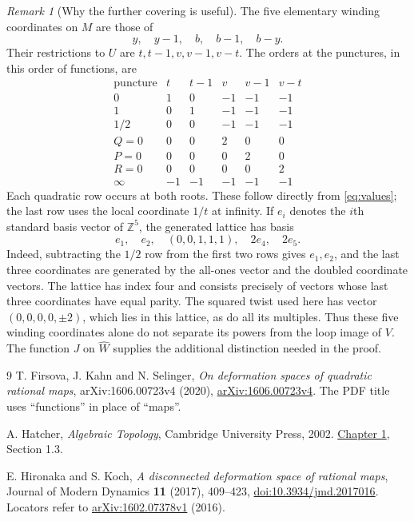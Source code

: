 \documentclass[11pt]{article}
\newcommand{\Z}{\mathbb Z}
\theoremstyle{remark}
\newtheorem{remark}[theorem]{Remark}
\begin{document}
\begin{remark}[Why the further covering is useful]\label{rem:lattice}
The five elementary winding coordinates on $M$ are those of
\[
 y,\quad y-1,\quad b,\quad b-1,\quad b-y.
\]
Their restrictions to $U$ are $t,t-1,v,v-1,v-t$. The orders at the punctures, in this order of functions, are
\[
\begin{array}{c|rrrrr}
\text{puncture}&t&t-1&v&v-1&v-t\\ \hline
0&1&0&-1&-1&-1\\
1&0&1&-1&-1&-1\\
1/2&0&0&-1&-1&-1\\
Q=0&0&0&2&0&0\\
P=0&0&0&0&2&0\\
R=0&0&0&0&0&2\\
\infty&-1&-1&-1&-1&-1
\end{array}
\]
Each quadratic row occurs at both roots. These follow directly from \eqref{eq:values}; the last row uses the local coordinate $1/t$ at infinity. If $e_i$ denotes the $i$th standard basis vector of $\Z^5$, the generated lattice has basis
\[
 e_1,\quad e_2,\quad (0,0,1,1,1),\quad 2e_4,\quad 2e_5.
\]
Indeed, subtracting the $1/2$ row from the first two rows gives $e_1,e_2$, and the last three coordinates are generated by the all-ones vector and the doubled coordinate vectors. The lattice has index four and consists precisely of vectors whose last three coordinates have equal parity. The squared twist used here has vector $(0,0,0,0,\pm2)$, which lies in this lattice, as do all its multiples. Thus these five winding coordinates alone do not separate its powers from the loop image of $V$. The function $J$ on $\widehat W$ supplies the additional distinction needed in the proof.
\end{remark}


\begin{thebibliography}{9}
T. Firsova, J. Kahn and N. Selinger,
\emph{On deformation spaces of quadratic rational maps},
arXiv:1606.00723v4 (2020),
\href{https://arxiv.org/abs/1606.00723v4}{arXiv:1606.00723v4}.
The PDF title uses ``functions'' in place of ``maps''.

A. Hatcher, \emph{Algebraic Topology}, Cambridge University Press, 2002.
\href{https://pi.math.cornell.edu/~hatcher/AT/ATch1.pdf}{Chapter 1}, Section 1.3.

E. Hironaka and S. Koch,
\emph{A disconnected deformation space of rational maps},
Journal of Modern Dynamics \textbf{11} (2017), 409--423,
\href{https://doi.org/10.3934/jmd.2017016}{doi:10.3934/jmd.2017016}.
Locators refer to \href{https://arxiv.org/abs/1602.07378v1}{arXiv:1602.07378v1} (2016).
\end{thebibliography}
\end{document}
